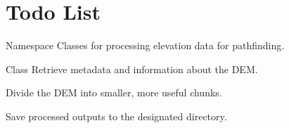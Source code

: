 \chapter{Todo List}
\hypertarget{todo}{}\label{todo}

\begin{DoxyRefList}
\item[Namespace \doxylink{namespaceMEMPA}{MEMPA} ]\label{todo__todo000001}%
%
Classes for processing elevation data for pathfinding. 
\item[Class \doxylink{classMEMPA_1_1BUF__DEM}{MEMPA\+::BUF\+\_\+\+DEM} ]\label{todo__todo000002}%
%
Retrieve metadata and information about the DEM. 



Divide the DEM into smaller, more useful chunks. 



Save processed outputs to the designated directory.
\end{DoxyRefList}